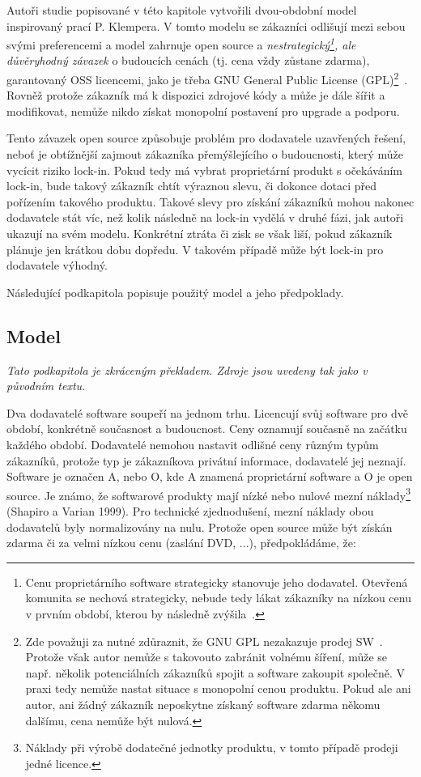 \begin{multicols}{2}
	Autoři studie popisované v této kapitole vytvořili dvou-obdobní model inspirovaný prací P. Klempera. V tomto modelu se zákazníci odlišují mezi sebou svými preferencemi a model zahrnuje open source a {\em nestrategický\footnote{Cenu proprietárního software strategicky stanovuje jeho dodavatel. Otevřená komunita se nechová strategicky, nebude tedy lákat zákazníky na nízkou cenu v prvním období, kterou by následně zvýšila~\cite[str. 2]{lock-in-competition}.}, ale důvěryhodný závazek} o budoucích cenách (tj. cena vždy zůstane zdarma), garantovaný OSS licencemi, jako je třeba GNU General Public License (GPL)\footnote{Zde považuji za nutné zdůraznit, že GNU GPL nezakazuje prodej SW~\cite{selling-foss}. Protože však autor nemůže s takovouto zabránit volnému šíření, může se např. několik potenciálních zákazníků spojit a software zakoupit společně. V praxi tedy nemůže nastat situace s monopolní cenou produktu. Pokud ale ani autor, ani žádný zákazník neposkytne získaný software zdarma někomu dalšímu, cena nemůže být nulová.}~\cite[str. 2]{lock-in-competition}. Rovněž protože zákazník má k dispozici zdrojové kódy a může je dále šířit a modifikovat, nemůže nikdo získat monopolní postavení pro upgrade a podporu.

	Tento závazek open source způsobuje problém pro dodavatele uzavřených řešení, neboť je obtížnější zajmout zákazníka přemýšlejícího o budoucnosti, který může vycícit riziko lock-in. Pokud tedy má vybrat proprietární produkt s očekáváním lock-in, bude takový zákazník chtít výraznou slevu, či dokonce dotaci před pořízením takového produktu. Takové slevy pro získání zákazníků mohou nakonec dodavatele stát víc, než kolik následně na lock-in vydělá v druhé fázi, jak autoři ukazují na svém modelu. Konkrétní ztráta či zisk se však liší, pokud zákazník plánuje jen krátkou dobu dopředu. V takovém případě může být lock-in pro dodavatele výhodný.

	Následující podkapitola popisuje použitý model a jeho předpoklady.

	\subsection*{Model}
	{\em Tato podkapitola je zkráceným překladem. Zdroje jsou uvedeny tak jako v původním textu.}

	Dva dodavatelé software soupeří na jednom trhu. Licencují svůj software pro dvě období, konkrétně současnost a budoucnost. Ceny oznamují současně na začátku každého období. Dodavatelé nemohou nastavit odlišné ceny různým typům zákazníků, protože typ je zákazníkova privátní informace, dodavatelé jej neznají. Software je označen A, nebo O, kde A znamená proprietární software a O je open source. Je známo, že softwarové produkty mají nízké nebo nulové mezní náklady\footnote{Náklady při výrobě dodatečné jednotky produktu, v tomto případě prodeji jedné licence.} (Shapiro a Varian 1999). Pro technické zjednodušení, mezní náklady obou dodavatelů byly normalizovány na nulu. Protože open source může být získán zdarma či za velmi nízkou cenu (zaslání DVD, ...), předpokládáme, že:


\end{multicols}
